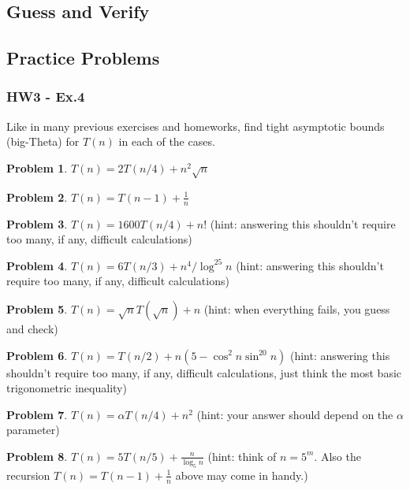 \documentclass[12pt]{article}
\theoremstyle{definition}
\newtheorem{practiceproblem}{Problem}[section]
\def\scratchwork{\vspace*{15em}} %
\newenvironment{problem}
	{\noindent\begin{minipage}{\textwidth}\begin{practiceproblem}}
	{\scratchwork\end{practiceproblem}\end{minipage}}
\begin{document}
	\subsection{Guess and Verify}

	\subsection{Practice Problems}

	\subsubsection{HW3 - Ex.4}

	Like in many previous exercises and homeworks, find tight asymptotic bounds
	(big-Theta) for $T(n)$ in each of the cases.

	\begin{problem}
		$T(n)=2T(n/4)+n^2\sqrt n$
	\end{problem}
	\begin{problem}
		$T(n)=T(n-1)+\frac1n$
	\end{problem}
	\begin{problem}
		$T(n)=1600T(n/4)+n!$ (hint: answering this shouldn't require too many,
		if any, difficult calculations)
	\end{problem}
	\begin{problem}
		$T(n)=6T(n/3)+n^4/\log^{25} n$ (hint: answering this shouldn't require
		too many, if any, difficult calculations)
	\end{problem}
	\begin{problem}
		$T(n)=\sqrt n T(\sqrt{n}) + n$ (hint: when everything fails, you guess
		and check)
	\end{problem}
	\begin{problem}
		$T(n)=T(n/2)+n(5-\cos^2n\sin^{20}n)$ (hint: answering this shouldn't
		require too many, if any, difficult calculations, just think the most
		basic trigonometric inequality)
	\end{problem}
	\begin{problem}
		$T(n)=\alpha T(n/4)+n^2$ (hint: your answer should depend on the
		$\alpha$ parameter)
	\end{problem}
	\begin{problem}
		$T(n)=5T(n/5) +\frac{n}{\log_5 n}$ (hint: think of $n=5^m$. Also the
		recursion $T(n)=T(n-1)+\frac1n$ above may come in handy.)
	\end{problem}

\end{document}
